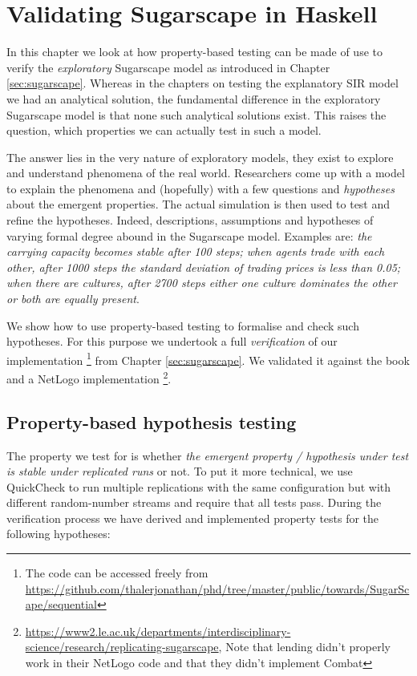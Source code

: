 \chapter{Validating Sugarscape in Haskell}
\label{app:validating_sugarscape}

In this chapter we look at how property-based testing can be made of use to verify the \textit{exploratory} Sugarscape model \cite{epstein_growing_1996} as introduced in Chapter \ref{sec:sugarscape}. Whereas in the chapters on testing the explanatory SIR model we had an analytical solution, the fundamental difference in the exploratory Sugarscape model is that none such analytical solutions exist. This raises the question, which properties we can actually test in such a model.

The answer lies in the very nature of exploratory models, they exist to explore and understand phenomena of the real world. Researchers come up with a model to explain the phenomena and (hopefully) with a few questions and \textit{hypotheses} about the emergent properties. The actual simulation is then used to test and refine the hypotheses. Indeed, descriptions, assumptions and hypotheses of varying formal degree abound in the Sugarscape model. Examples are: \textit{the carrying capacity becomes stable after 100 steps; when agents trade with each other, after 1000 steps the standard deviation of trading prices is less than 0.05; when there are cultures, after 2700 steps either one culture dominates the other or both are equally present}. 

We show how to use property-based testing to formalise and check such hypotheses. For this purpose we undertook a full \textit{verification} of our implementation \footnote{The code can be accessed freely from \url{https://github.com/thalerjonathan/phd/tree/master/public/towards/SugarScape/sequential}} from Chapter \ref{sec:sugarscape}. We validated it against the book \cite{epstein_growing_1996} and a NetLogo implementation \cite{weaver_replicating_2009} \footnote{\url{https://www2.le.ac.uk/departments/interdisciplinary-science/research/replicating-sugarscape}, Note that lending didn't properly work in their NetLogo code and that they didn't implement Combat}. 

\section{Property-based hypothesis testing}
The property we test for is whether \textit{the emergent property / hypothesis under test is stable under replicated runs} or not. To put it more technical, we use QuickCheck to run multiple replications with the same configuration but with different random-number streams and require that all tests pass. During the verification process we have derived and implemented property tests for the following hypotheses:

